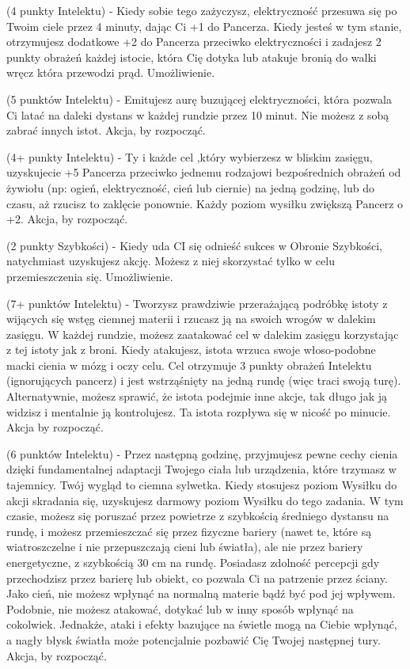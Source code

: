 { (4 punkty Intelektu) - Kiedy sobie tego zażyczysz, elektryczność przesuwa się po Twoim ciele przez 4 minuty, dając Ci +1 do Pancerza. Kiedy jesteś w tym stanie, otrzymujesz dodatkowe +2 do Pancerza przeciwko elektryczności i zadajesz 2 punkty obrażeń każdej istocie, która Cię dotyka lub atakuje bronią do walki wręcz która przewodzi prąd. Umożliwienie.

  (5 punktów Intelektu) - Emitujesz aurę buzującej elektryczności, która pozwala Ci latać na daleki dystans w każdej rundzie przez 10 minut. Nie możesz z sobą zabrać innych istot. Akcja, by rozpocząć. 

 (4+ punkty Intelektu) - Ty i każde cel ,który wybierzesz w bliskim zasięgu, uzyskujecie +5 Pancerza przeciwko jednemu rodzajowi bezpośrednich obrażeń od żywiołu (np: ogień, elektryczność, cień lub ciernie) na jedną godzinę, lub do czasu, aż rzucisz to zaklęcie ponownie. Każdy poziom wysiłku zwiększą Pancerz o +2. Akcja, by rozpocząć. 

 (2 punkty Szybkości) - Kiedy uda CI się odnieść sukces w Obronie Szybkości, natychmiast uzyskujesz akcję. Możesz z niej skorzystać tylko w celu przemieszczenia się. Umożliwienie.

 (7+ punktów Intelektu) - Tworzysz prawdziwie przerażającą podróbkę istoty z wijących się wstęg ciemnej materii i rzucasz ją na swoich wrogów w dalekim zasięgu. W każdej rundzie, możesz zaatakować cel w dalekim zasięgu korzystając z tej istoty jak z broni. Kiedy atakujesz, istota wrzuca swoje włoso-podobne macki cienia w mózg i oczy celu. Cel otrzymuje 3 punkty obrażeń Intelektu (ignorujących pancerz) i jest wstrząśnięty na jedną rundę (więc traci swoją turę). Alternatywnie, możesz sprawić, że istota podejmie inne akcje, tak długo jak ją widzisz i mentalnie ją kontrolujesz. Ta istota rozpływa się w nicość po minucie. Akcja by rozpocząć.

 (6 punktów Intelektu) - Przez następną godzinę, przyjmujesz pewne cechy cienia dzięki fundamentalnej adaptacji Twojego ciała lub urządzenia, które trzymasz w tajemnicy. Twój wygląd to ciemna sylwetka. Kiedy stosujesz poziom Wysiłku do akcji skradania się, uzyskujesz darmowy poziom Wysiłku do tego zadania. W tym czasie, możesz się poruszać przez powietrze z szybkością średniego dystansu na rundę,  i możesz przemieszczać się przez fizyczne bariery (nawet te, które są wiatroszczelne i nie przepuszczają cieni lub światła), ale nie przez bariery energetyczne, z szybkością 30 cm na rundę. Posiadasz zdolność percepcji gdy przechodzisz przez barierę lub obiekt, co pozwala Ci na patrzenie przez ściany. Jako cień, nie możesz wpłynąć na normalną materie bądź być pod jej wpływem. Podobnie, nie możesz atakować, dotykać lub w inny sposób wpłynąć na cokolwiek. Jednakże, ataki i efekty bazujące na świetle mogą na Ciebie wpłynąć, a nagły błysk światła może potencjalnie pozbawić Cię Twojej następnej tury. Akcja, by rozpocząć. 

}
